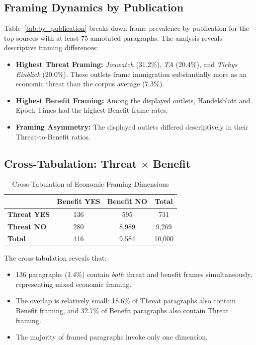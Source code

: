 \subsection{Framing Dynamics by Publication}
Table~\ref{tab:by_publication} breaks down frame prevalence by publication for the top sources with at least 75 annotated paragraphs. The analysis reveals descriptive framing differences:
\begin{itemize}
    \item \textbf{Highest Threat Framing:} \textit{Jouwatch} (31.2\%), \textit{TA} (20.4\%), and \textit{Tichys Einblick} (20.0\%). These outlets frame immigration substantially more as an economic threat than the corpus average (7.3\%).
    \item \textbf{Highest Benefit Framing:} Among the displayed outlets, Handelsblatt and Epoch Times had the highest Benefit-frame rates.
    \item \textbf{Framing Asymmetry:} The displayed outlets differed descriptively in their Threat-to-Benefit ratios.
\end{itemize}

\subsection{Cross-Tabulation: Threat $\times$ Benefit}

\begin{table}[H]
\centering
\caption{Cross-Tabulation of Economic Framing Dimensions}
\label{tab:crosstab}
\begin{tabular}{@{}lcc|c@{}}
\toprule
 & \textbf{Benefit YES} & \textbf{Benefit NO} & \textbf{Total} \\
\midrule
\textbf{Threat YES} & 136  & 595   & 731 \\
\textbf{Threat NO}  & 280  & 8,989 & 9,269 \\
\midrule
\textbf{Total}      & 416  & 9,584 & 10,000 \\
\bottomrule
\end{tabular}
\end{table}

The cross-tabulation reveals that:
\begin{itemize}
    \item 136 paragraphs (1.4\%) contain \textit{both} threat and benefit frames simultaneously, representing mixed economic framing.
    \item The overlap is relatively small: 18.6\% of Threat paragraphs also contain Benefit framing, and 32.7\% of Benefit paragraphs also contain Threat framing.
    \item The majority of framed paragraphs invoke only one dimension.
\end{itemize}

